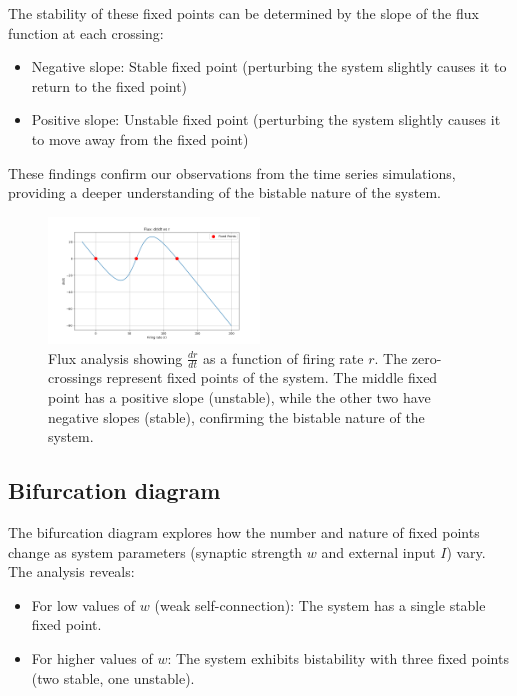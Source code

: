 \documentclass{article}
\begin{document}
The stability of these fixed points can be determined by the slope of the flux function at each crossing:
\begin{itemize}
    \item Negative slope: Stable fixed point (perturbing the system slightly causes it to return to the fixed point)
    \item Positive slope: Unstable fixed point (perturbing the system slightly causes it to move away from the fixed point)
\end{itemize}

These findings confirm our observations from the time series simulations, providing a deeper understanding of the bistable nature of the system.

\begin{figure}[H]
    \centering
    \includegraphics[width=0.5\textwidth]{flux_analysis.png}
    \caption{Flux analysis showing $\frac{dr}{dt}$ as a function of firing rate $r$. The zero-crossings represent fixed points of the system. The middle fixed point has a positive slope (unstable), while the other two have negative slopes (stable), confirming the bistable nature of the system.}
    \label{fig:flux}
\end{figure}


\subsection{Bifurcation diagram}

The bifurcation diagram explores how the number and nature of fixed points change as system parameters (synaptic strength $w$ and external input $I$) vary. The analysis reveals:

\begin{itemize}
    \item For low values of $w$ (weak self-connection): The system has a single stable fixed point.
    \item For higher values of $w$: The system exhibits bistability with three fixed points (two stable, one unstable).
\end{itemize}
\end{document}
